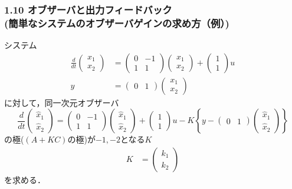 \begin{frame}[t]
\frametitle{1.10 オブザーバと出力フィードバック \\
(簡単なシステムのオブザーバゲインの求め方（例）)}
システム
\begin{align}
 \frac{d}{dt}
 \left(
 \begin{array}{c}
  x_1 \\
  x_2
 \end{array}
 \right)
 &=
 \left(
 \begin{array}{cc}
  0 & -1 \\
  1 & 1
 \end{array}
 \right)
 \left(
 \begin{array}{c}
  x_1 \\
  x_2
 \end{array}
 \right) +
 \left(
 \begin{array}{c}
  1 \\
  1
 \end{array}
 \right) u \\
 y &=
 \left(
 \begin{array}{cc}
  0 & 1
 \end{array}
 \right)
 \left(
 \begin{array}{c}
  x_1 \\
  x_2
 \end{array}
 \right)
\end{align}
に対して，同一次元オブザーバ
\begin{equation}
 \frac{d}{dt}
 \left(
 \begin{array}{c}
  \hat{x}_1 \\
  \hat{x}_2
 \end{array}
 \right)
 =
 \left(
 \begin{array}{cc}
  0 & -1 \\
  1 & 1
 \end{array}
 \right)
 \left(
 \begin{array}{c}
  \hat{x}_1 \\
  \hat{x}_2
 \end{array}
 \right) +
 \left(
 \begin{array}{c}
  1 \\
  1
 \end{array}
 \right) u -
 K\left\{y -
 \left(
 \begin{array}{cc}
  0 & 1
 \end{array}
 \right)
 \left(
 \begin{array}{c}
  \hat{x}_1 \\
  \hat{x}_2
 \end{array}
 \right)\right\}
\end{equation}
の極($(A+KC)$の極)が$-1, -2$となる$K$
\begin{align}
 K&=
 \left(
 \begin{array}{c}
  k_1 \\
  k_2
 \end{array}
 \right)
\end{align}
を求める．
\end{frame}


